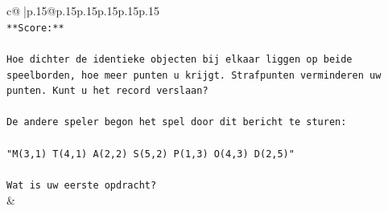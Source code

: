 \documentclass{article}
\begin{document}
{\begin{supertabular}{c@{$\;$}|p{.15\linewidth}@{}p{.15\linewidth}p{.15\linewidth}p{.15\linewidth}p{.15\linewidth}p{.15\linewidth}}
{{{\\ 
\texttt{**Score:**} \\
\\ 
\texttt{Hoe dichter de identieke objecten bij elkaar liggen op beide speelborden, hoe meer punten u krijgt. Strafpunten verminderen uw punten. Kunt u het record verslaan?} \\
\\ 
\texttt{De andere speler begon het spel door dit bericht te sturen:} \\
\\ 
\texttt{"M(3,1) T(4,1) A(2,2) S(5,2) P(1,3) O(4,3) D(2,5)"} \\
\\ 
\texttt{Wat is uw eerste opdracht?} \\
            }
        }
    }
    & \\ \\


\end{supertabular}}
\end{document}
